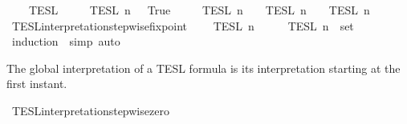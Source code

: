 \begin{isabellebody}
\ \ {\isacharparenleft}{\isacartoucheopen}{\isasymlbrakk}{\isasymlbrakk}\ {\isacharunderscore}\ {\isasymrbrakk}{\isasymrbrakk}\isactrlsub T\isactrlsub E\isactrlsub S\isactrlsub L\isactrlbsup {\isasymge}\ {\isacharunderscore}\isactrlesup {\isacartoucheclose}{\isacharparenright}\isanewline
{}\isanewline
\ \ {\isacartoucheopen}{\isasymlbrakk}{\isasymlbrakk}\ {\isacharbrackleft}{\isacharbrackright}\ {\isasymrbrakk}{\isasymrbrakk}\isactrlsub T\isactrlsub E\isactrlsub S\isactrlsub L\isactrlbsup {\isasymge}\ n\isactrlesup \ {\isacharequal}\ {\isacharbraceleft}{\isasymrho}{\isachardot}\ True{\isacharbraceright}{\isacartoucheclose}\isanewline
{\isacharbar}\ {\isacartoucheopen}{\isasymlbrakk}{\isasymlbrakk}\ {\isasymphi}\ {\isacharhash}\ {\isasymPhi}\ {\isasymrbrakk}{\isasymrbrakk}\isactrlsub T\isactrlsub E\isactrlsub S\isactrlsub L\isactrlbsup {\isasymge}\ n\isactrlesup \ {\isacharequal}\ {\isasymlbrakk}\ {\isasymphi}\ {\isasymrbrakk}\isactrlsub T\isactrlsub E\isactrlsub S\isactrlsub L\isactrlbsup {\isasymge}\ n\isactrlesup \ {\isasyminter}\ {\isasymlbrakk}{\isasymlbrakk}\ {\isasymPhi}\ {\isasymrbrakk}{\isasymrbrakk}\isactrlsub T\isactrlsub E\isactrlsub S\isactrlsub L\isactrlbsup {\isasymge}\ n\isactrlesup {\isacartoucheclose}\isanewline
\isanewline
{}\isamarkupfalse%
\ TESL{\isacharunderscore}interpretation{\isacharunderscore}stepwise{\isacharunderscore}fixpoint{\isacharcolon}\isanewline
\ \ {\isacartoucheopen}{\isasymlbrakk}{\isasymlbrakk}\ {\isasymPhi}\ {\isasymrbrakk}{\isasymrbrakk}\isactrlsub T\isactrlsub E\isactrlsub S\isactrlsub L\isactrlbsup {\isasymge}\ n\isactrlesup \ {\isacharequal}\ {\isasymInter}\ {\isacharparenleft}{\isacharparenleft}{\isasymlambda}{\isasymphi}{\isachardot}\ {\isasymlbrakk}\ {\isasymphi}\ {\isasymrbrakk}\isactrlsub T\isactrlsub E\isactrlsub S\isactrlsub L\isactrlbsup {\isasymge}\ n\isactrlesup {\isacharparenright}\ {\isacharbackquote}\ set\ {\isasymPhi}{\isacharparenright}{\isacartoucheclose}\isanewline
%
\isadelimproof
%
\endisadelimproof
%
\isatagproof
{}\isamarkupfalse%
\ {\isacharparenleft}induction\ {\isasymPhi}{\isacharcomma}\ simp{\isacharcomma}\ auto{\isacharparenright}%
\endisatagproof
{\isafoldproof}%
%
\isadelimproof
%
\endisadelimproof
%
\begin{isamarkuptext}%
The global interpretation of a TESL formula is its interpretation starting
  at the first instant.%
\end{isamarkuptext}\isamarkuptrue%
\isamarkupfalse%
\ TESL{\isacharunderscore}interpretation{\isacharunderscore}stepwise{\isacharunderscore}zero{\isacharcolon}\isanewline

\end{isabellebody}
